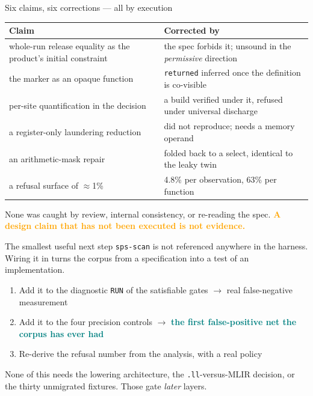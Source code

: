 \documentclass[aspectratio=169,10pt]{beamer}
\newcommand{\good}[1]{\textcolor{Teal}{\textbf{#1}}}
\newcommand{\bad}[1]{\textcolor{Orange}{\textbf{#1}}}
\newcommand{\code}[1]{\texttt{#1}}
\newcommand{\vs}{\textcolor{Muted}{$\rightarrow$}}
\begin{document}
\begin{frame}{Six claims, six corrections --- all by execution}
  \begin{center}
  \small
  \begin{tabular}{@{}p{} p{}@{}}
  \toprule
  Claim & Corrected by \\
  \midrule
  whole-run release equality as the product's initial constraint
    & the spec forbids it; unsound in the \emph{permissive} direction \\
  the marker as an opaque function
    & \code{returned} inferred once the definition is co-visible \\
  per-site quantification in the decision
    & a build verified under it, refused under universal discharge \\
  a register-only laundering reduction
    & did not reproduce; needs a memory operand \\
  an arithmetic-mask repair
    & folded back to a select, identical to the leaky twin \\
  a refusal surface of $\approx$1\%
    & 4.8\% per observation, 63\% per function \\
  \bottomrule
  \end{tabular}
  \end{center}

  \vspace{0.6em}
  None was caught by review, internal consistency, or re-reading the spec.
  \bad{A design claim that has not been executed is not evidence.}
\end{frame}

\begin{frame}{The smallest useful next step}
  \code{sps-scan} is not referenced anywhere in the harness. Wiring it in turns
  the corpus from a specification into a test of an implementation.

  \begin{enumerate}
    \item Add it to the diagnostic \code{RUN} of the satisfiable gates \vs{}
          real false-negative measurement
    \item Add it to the four precision controls \vs{} \good{the first
          false-positive net the corpus has ever had}
    \item Re-derive the refusal number from the analysis, with a real policy
  \end{enumerate}

  \vspace{0.8em}
  None of this needs the lowering architecture, the \code{.ll}-versus-MLIR
  decision, or the thirty unmigrated fixtures. Those gate \emph{later} layers.
\end{frame}
\end{document}
